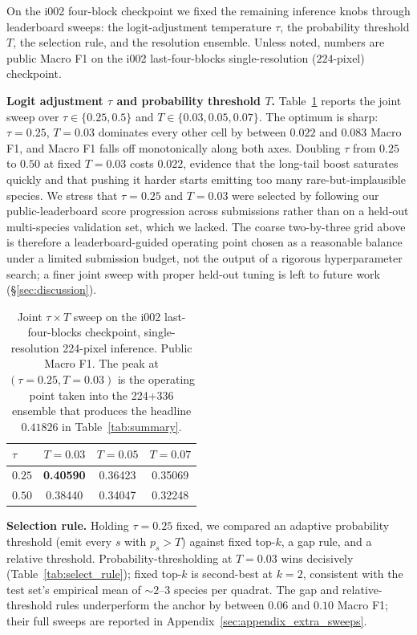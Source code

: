 On the i002 four-block checkpoint we fixed the remaining inference knobs through leaderboard
sweeps: the logit-adjustment temperature $\tau$, the probability threshold $T$, the selection
rule, and the resolution ensemble. Unless noted, numbers are public Macro F1 on the i002
last-four-blocks single-resolution ($224$-pixel) checkpoint.

\textbf{Logit adjustment $\tau$ and probability threshold $T$.} Table~\ref{tab:tau_T} reports
the joint sweep over $\tau \in \{0.25, 0.5\}$ and $T \in \{0.03, 0.05, 0.07\}$. The optimum is
sharp: $\tau{=}0.25$, $T{=}0.03$ dominates every other cell by between $0.022$ and $0.083$ Macro
F1, and Macro F1 falls off monotonically along both axes. Doubling $\tau$ from $0.25$ to $0.50$
at fixed $T{=}0.03$ costs $0.022$, evidence that the long-tail boost saturates quickly and
that pushing it harder starts emitting too many rare-but-implausible species. We stress that
$\tau{=}0.25$ and $T{=}0.03$ were selected by following our public-leaderboard score progression
across submissions rather than on a held-out multi-species validation set, which we lacked. The
coarse two-by-three grid above is therefore a leaderboard-guided operating point chosen as a
reasonable balance under a limited submission budget, not the output of a rigorous hyperparameter
search; a finer joint sweep with proper held-out tuning is left to future work
(\S\ref{sec:discussion}).

\begin{table}[ht]
  \centering
  \small
  \begin{tabular}{lccc}
    \toprule
    $\tau$ & $T{=}0.03$ & $T{=}0.05$ & $T{=}0.07$ \\
    \midrule
    $0.25$ & \textbf{0.40590} & 0.36423 & 0.35069 \\
    $0.50$ & 0.38440 & 0.34047 & 0.32248 \\
    \bottomrule
  \end{tabular}
  \caption{Joint $\tau \times T$ sweep on the i002 last-four-blocks checkpoint, single-resolution 224-pixel inference. Public Macro F1. The peak at $(\tau{=}0.25, T{=}0.03)$ is the operating point taken into the 224+336 ensemble that produces the headline $0.41826$ in Table~\ref{tab:summary}.}
  \label{tab:tau_T}
\end{table}

\textbf{Selection rule.} Holding $\tau{=}0.25$ fixed, we compared an adaptive probability
threshold (emit every $s$ with $p_s > T$) against fixed top-$k$, a gap rule, and a relative
threshold. Probability-thresholding at $T{=}0.03$ wins decisively (Table~\ref{tab:select_rule});
fixed top-$k$ is second-best at $k{=}2$, consistent with the test set's empirical mean of
${\sim}2$--$3$ species per quadrat. The gap and relative-threshold rules underperform the anchor
by between $0.06$ and $0.10$ Macro F1; their full sweeps are reported in
Appendix~\ref{sec:appendix_extra_sweeps}.

